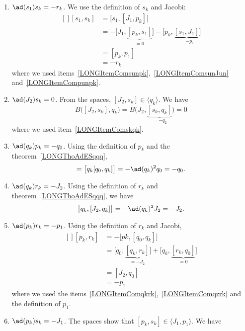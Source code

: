 \begin{enumerate}
	\item$\ad(s_1)s_k=-r_k$\label{LONGItemComsunsk}. We use the definition of $s_k$ and Jacobi:
		\begin{equation}
			\begin{aligned}[]
				[s_1,s_k]&=\big[ s_1,[J_1,p_k] \big]\\
				&=-\big[ J_1,\underbrace{[p_k,s_1]}_{=0} \big]-\big[ p_k,\underbrace{[s_1,J_1]}_{=-p_1} \big]\\
					&=[p_k,p_1]\\
					&=-r_k
			\end{aligned}
		\end{equation}
		where we used items~\ref{LONGItemComsunpk},~\ref{LONGItemComsunJun} and~\ref{LONGItemCompunpk}.
	\item$\ad(J_2)s_k=0$. From the spaces, $[J_2,s_k]\in\langle q_k\rangle$. We have
		\begin{equation}
			B\big( [J_2,s_k],q_k \big)=B\big( J_2,\underbrace{[s_k,q_k]}_{=-q_2} \big)=0
		\end{equation}
		where we used item~\ref{LONGItemComskqk}.
	\item$\ad(q_k)p_k=-q_0$. Using the definition of $p_k$ and the theorem~\ref{LONGThoAdESqqq},
		\begin{equation}
			[q_k,p_k]=\big[ q_k[q_0,q_k] \big]=-\ad(q_k)^2q_0=-q_0.
		\end{equation}
	\item$\ad(q_k)r_k=-J_2$\label{LONGItemComqkrk}. Using the definition of $r_k$ and theorem~\ref{LONGThoAdESqqq}, we have
		\begin{equation}
			\big[ q_k,[J_2,q_k] \big]=-\ad(q_k)^2J_2=-J_2.
		\end{equation}
	\item$\ad(p_k)r_k=-p_1$. Using the definition of $r_k$ and Jacobi,
		\begin{equation}
			\begin{aligned}[]
				[p_k,r_k]&=-\big[ pk,[q_0,q_k] \big]\\
				&=\big[ q_0,\underbrace{[q_k,r_k]}_{=-J_2} \big]+\big[ q_k,\underbrace{[r_k,q_0]}_{=0} \big]\\
					&=[J_2,q_0]\\
					&=-p_1
			\end{aligned}
		\end{equation}
		where we used the items~\ref{LONGItemComqkrk},~\ref{LONGItemComqzrk} and the definition of $p_1$.
	\item$\ad(p_k)s_k=-J_1$. The spaces show that $[p_k,s_k]\in\langle J_1,p_1\rangle$. We have

\end{enumerate}
